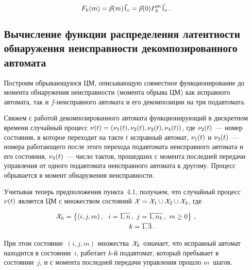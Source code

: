 \begin{multicols}{2}
\vspace*{-2pt}

\noindent
$$
F_k(m)=\vec p(m) \vec 1_e = \vec p(0) P_k^{m} \vec 1_e\,.
$$


\vspace*{-9pt}

\subsection{Вычисление функции распределения латентности обнаружения
неисправности декомпозированного автомата}

\vspace*{-2pt}

 Построим обрывающуюся ЦМ, опи\-сы\-ва\-ющую совместное функционирование до
момента обнаружения неисправности (момента обрыва ЦМ) как исправного
автомата, так и $f$-неисправного автомата и его декомпозиции на три подавтомата.

Свяжем с работой декомпозированного автомата функционирующий в дискретном
времени случайный процесс $\nu(t)=(\nu_1(t),\nu_2(t),\nu_2(t),\nu_4(t))$, где
$\nu_2(t)$~--- номер состояния, в которое переходит на такте $t$ исправный
автомат,
$\nu_1(t)$ и $\nu_3(t)$~--- номера работающего после этого перехода
подавтомата неисправного автомата и его состояния,
$\nu_4(t)$~--- число тактов, прошедших с момента последней передачи
управления от одного подавтомата неисправного автомата к другому.
Процесс обрывается в момент обнаружения неисправности.

Учитывая теперь предположения пункта~4.1, получаем, что случайный процесс
$\nu(t)$ является ЦМ с множеством состояний
${\cal X}={\cal X}_1\cup{\cal X}_2\cup{\cal X}_3$,
где

\noindent

\vspace*{-10pt}

\begin{multline*}
{\cal X}_k
=\left \{(i,j,m)\,,\ \  i=\overline{1,n}\,,\   j=\overline{1,n_k}\,,\  m\ge0\right \}\,,\\
\ \ \ \ \ \ \ \ \ \ \ \ \ \ k=\overline{1,3}\,.
\end{multline*}

\vspace*{-6pt}

\noindent
При этом состояние~$(i,j,m)$ множества~${\cal X}_k$ означает, что исправный
автомат находится в со\-сто\-янии~$i$, работает $k$-й подавтомат, который
пребывает в со\-сто\-янии~$j$, и с момента последней передачи управ\-ле\-ния прошло
$m$~шагов.


\end{multicols}
